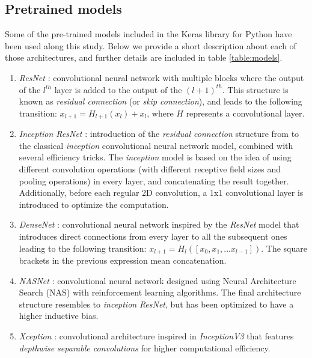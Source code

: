 \subsection{Pretrained models}
Some of the pre-trained models included in the Keras library for Python \autocite{chollet2015keras} have been used along this study. Below we provide a short description about each of those architectures, and further details are included in table \ref{table:models}.

\begin{enumerate}
   	\item \textit{ResNet} \autocite{he2016}: convolutional neural network with multiple blocks where the output of the $l^{th}$ layer is added to the output of the $(l+1)^{th}$. This structure is known as \textit{residual connection} (or \textit{skip connection}), and leads to the following transition: $x_{l+1} = H_{l+1}(x_{l}) + x_l$, where $H$ represents a convolutional layer.
   	\item \textit{Inception ResNet} \autocite{szegedy2017}: introduction of the \textit{residual connection} structure from \autocite{he2016} to the classical \textit{inception} convolutional neural network model, combined with several efficiency tricks. The \textit{inception} model is based on the idea of using different convolution operations (with different receptive field sizes and pooling operations) in every layer, and concatenating the result together. Additionally, before each regular 2D convolution, a 1x1 convolutional layer is introduced to optimize the computation.
   	\item \textit{DenseNet} \autocite{huang2017}: convolutional neural network inspired by the \textit{ResNet} model \autocite{he2016} that introduces direct connections from every layer to all the subsequent ones leading to the following transition: $x_{l+1} = H_l([x_0, x_1, ... x_{l-1}])$. The square brackets in the previous expression mean concatenation.
   	\item \textit{NASNet} \autocite{pham2018}: convolutional neural network designed using Neural Architecture Search (NAS) with reinforcement learning algorithms. The final architecture structure resembles to \textit{inception} \textit{ResNet}, but has been optimized to have a higher inductive bias.
   	\item \textit{Xception} \autocite{chollet2017}: convolutional architecture inspired in \textit{InceptionV3}  \autocite{szegedy2016} that features \textit{depthwise separable convolutions} for higher computational efficiency.

\end{enumerate}
